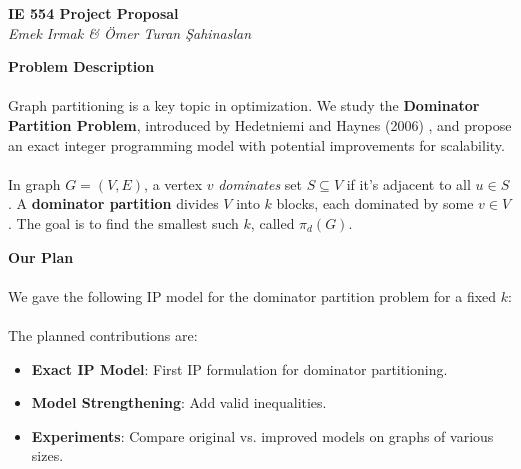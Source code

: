 \documentclass[12pt]{article}
\begin{document}

\begin{center}
    \Large \textbf{IE 554 Project Proposal} \\
    \normalsize \textsl{Emek Irmak \& Ömer Turan Şahinaslan}
\end{center}

\textbf{\large Problem Description}
\vspace*{-2mm}

\paragraph{} Graph partitioning is a key topic in optimization. We study the \textbf{Dominator Partition Problem}, introduced by Hedetniemi and Haynes (2006) \cite{dominator_partitions}, and propose an exact integer programming model with potential improvements for scalability.

\paragraph{} In graph $G = (V, E)$, a vertex $v$ \textit{dominates} set $S \subseteq V$ if it's adjacent to all $u \in S$. A \textbf{dominator partition} divides $V$ into $k$ blocks, each dominated by some $v \in V$. The goal is to find the smallest such $k$, called $\pi_d(G)$.

\vspace{5mm}

\textbf{\large Our Plan}
\vspace*{-2mm}

\paragraph{} We gave the following IP model for the dominator partition problem for a fixed $k$:

\hspace{4mm}
\scalebox{0.95}{%
  \parbox{\linewidth}{%
  }%
}

\vspace{-6mm}
\paragraph{} The planned contributions are:
\begin{itemize}[label=, itemsep=0pt]
    \item \textbf{Exact IP Model}: First IP formulation for dominator partitioning.
    \item \textbf{Model Strengthening}: Add valid inequalities.
    \item \textbf{Experiments}: Compare original vs. improved models on graphs of various sizes.
\end{itemize}
\end{document}
